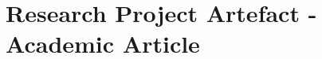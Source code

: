 
\chapter{Research Project Artefact - Academic Article} %

\label{AppendixC} %
%

\begin{minipage}{\textwidth}

\end{minipage}
